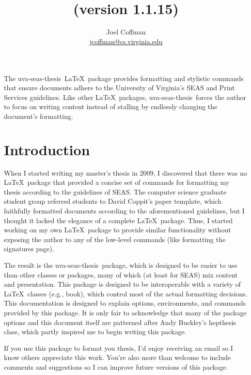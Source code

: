 \documentclass[10pt]{article}
\title{\thispackage\\{\normalsize (version 1.1.15)}}
\author{
  Joel Coffman\\
  \url{jcoffman@cs.virginia.edu}
}
\newcommand{\class}[1]{#1}
\newcommand{\package}[1]{#1}
\newcommand{\thispackage}{\package{uva-seas-thesis}}
\begin{document}
\maketitle

The \thispackage\ \LaTeX\ package provides formatting and stylistic commands that ensure documents adhere to the University of Virginia's \gls{SEAS} and Print Services guidelines.
Like other \LaTeX\ packages, \thispackage\ forces the author to focus on writing content instead of stalling by endlessly changing the document's formatting.

\section{Introduction}\label{section:introduction}
When I started writing my master's thesis in 2009, I discovered that there was no \LaTeX\ package that provided a concise set of commands for formatting my thesis according to the guidelines of \gls{SEAS}.
The computer science graduate student group referred students to David Coppit's paper template, which faithfully formatted documents according to the aforementioned guidelines, but I thought it lacked the elegance of a complete \LaTeX\ package.
Thus, I started working on my own \LaTeX\ package to provide similar functionality without exposing the author to any of the low-level commands (like formatting the signatures page).

The result is the \thispackage\ package, which is designed to be easier to use than other classes or packages, many of which (at least for \gls{SEAS}) mix content and presentation.
This package is designed to be interoperable with a variety of \LaTeX\ classes (e.g., \class{book}), which control most of the actual formatting decisions.
This documentation is designed to explain options, environments, and commands provided by this package.
It is only fair to acknowledge that many of the package options and this document itself are patterned after Andy Buckley's \class{hepthesis} class, which partly inspired me to begin writing this package.

If you use this package to format you thesis, I'd enjoy receiving an email so I know others appreciate this work.
You're also more than welcome to include comments and suggestions so I can improve future versions of this package.

\end{document}
